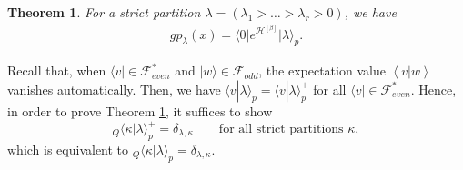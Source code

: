 \documentclass{amsart}
\newtheorem{thm}{Theorem}[section]
\def\ket#1{\vert #1 \rangle}
\def\bra#1{\langle #1 \vert}
\def\inner#1#2{\left\langle #1|#2\right\rangle}
\begin{document}
\begin{thm}\label{thm:fermion_of_gp}
For a strict partition $\lambda=(\lambda_1>\dots>\lambda_r>0)$, we have
\begin{equation}\label{eq:def_of_gp}
\begin{aligned}
gp_\lambda(x)=\bra{0}e^{\mathcal{H}^{[\beta]}}\ket{\lambda}_p.
\end{aligned}
\end{equation}
\end{thm}

Recall that, when $\bra{v}\in \mathcal{F}^\ast_{even}$ and $\ket{w}\in \mathcal{F}_{odd}$, the expectation value $\inner{v}{w}$ vanishes automatically.
Then, we have
$
\langle v|\lambda\rangle_p=\langle v|\lambda\rangle_p^+
$
for all $\bra{v}\in \mathcal{F}^\ast_{even}$.
Hence, in order to prove Theorem \ref{thm:fermion_of_gp}, it suffices to show
\begin{equation}\label{eq:to_prove}
{}_{Q}\langle
\kappa|\lambda
\rangle^+_p
=\delta_{\lambda,\kappa}\qquad \text{for all strict partitions $\kappa$},
\end{equation}
which is equivalent to ${}_{Q}\langle
\kappa|\lambda
\rangle_p
=\delta_{\lambda,\kappa}$.
\end{document}
